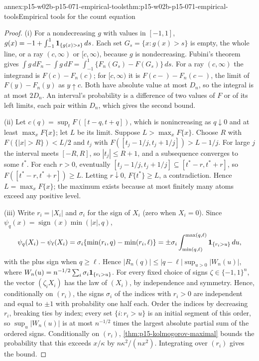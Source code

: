 \begin{annexitem}{annex:p15-w02b-p15-071-empirical-tools}{thm:p15-w02b-p15-071-empirical-tools}{Empirical tools for the count equation}
\begin{proof}
(i) For a nondecreasing \(g\) with values in
\([-1,1]\), \(g(x)=-1+\int_{-1}^1{\bf1}_{\{g(x)>s\}}\,ds\). Each set
\(G_s=\{x:g(x)>s\}\) is empty, the whole line, or a ray
\((c,\infty)\) or \([c,\infty)\), because \(g\) is nondecreasing.
Fubini's theorem gives
\(\int g\,dF_n-\int g\,dF=\int_{-1}^1\{F_n(G_s)-F(G_s)\}\,ds\).
For a ray \((c,\infty)\) the integrand is \(F(c)-F_n(c)\); for
\([c,\infty)\) it is \(F(c-)-F_n(c-)\), the limit of
\(F(y)-F_n(y)\) as \(y\uparrow c\). Both have absolute value at most
\(D_n\), so the integral is at most \(2D_n\). An interval's
probability is a difference of two values of \(F\) or of its left
limits, each pair within \(D_n\), which gives the second bound.

(ii) Let \(c(q)=\sup_tF([t-q,t+q])\), which is nonincreasing as
\(q\downarrow0\) and at least \(\max_xF\{x\}\); let \(L\) be its limit.
Suppose \(L>\max_xF\{x\}\). Choose \(R\) with
\(F(\{|x|>R\})<L/2\) and \(t_j\) with
\(F([t_j-1/j,t_j+1/j])>L-1/j\). For large \(j\) the interval meets
\([-R,R]\), so \(|t_j|\leq R+1\), and a subsequence converges to some
\(t^*\). For each \(r>0\), eventually
\([t_j-1/j,t_j+1/j]\subseteq[t^*-r,t^*+r]\), so
\(F([t^*-r,t^*+r])\geq L\). Letting \(r\downarrow0\),
\(F\{t^*\}\geq L\), a contradiction. Hence \(L=\max_xF\{x\}\); the
maximum exists because at most finitely many atoms exceed any positive
level.

(iii) Write \(r_i=|X_i|\) and \(\sigma_i\) for the sign of \(X_i\)
(zero when \(X_i=0\)). Since
\(\psi_q(x)=\operatorname{sign}(x)\min(|x|,q)\),
\[
 \psi_q(X_i)-\psi_\ell(X_i)=\sigma_i\{\min(r_i,q)-\min(r_i,\ell)\}
 =\pm\sigma_i\int_{\min(q,\ell)}^{\max(q,\ell)}{\bf1}_{\{r_i>u\}}\,du,
\]
with the plus sign when \(q\geq\ell\). Hence
\(|R_n(q)|\leq|q-\ell|\sup_{u>0}|W_n(u)|\), where
\(W_n(u)=n^{-1/2}\sum_i\sigma_i{\bf1}_{\{r_i>u\}}\).
For every fixed choice of signs \(\zeta\in\{-1,1\}^n\), the vector
\((\zeta_iX_i)\) has the law of \((X_i)\), by independence and
symmetry. Hence, conditionally on \((r_i)\), the signs \(\sigma_i\) of
the indices with \(r_i>0\) are independent and equal to \(\pm1\) with
probability one half each. Order the indices by decreasing \(r_i\),
breaking ties by index; every set \(\{i:r_i>u\}\) is an initial segment
of this order, so \(\sup_u|W_n(u)|\) is at most \(n^{-1/2}\) times the
largest absolute partial sum of the ordered signs. Conditionally on
\((r_i)\), \cref{thm:p15-kolmogorov-maximal} bounds the probability
that this exceeds \(x/\kappa\) by \(n\kappa^2/(nx^2)\). Integrating over
\((r_i)\) gives the bound.


\end{proof}
\end{annexitem}
